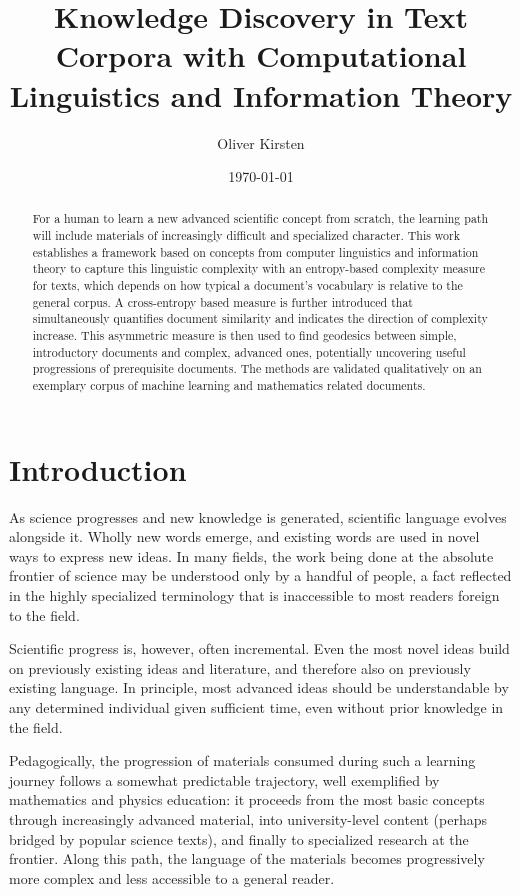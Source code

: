 \documentclass[12pt,a4paper]{article}
\title{Knowledge Discovery in Text Corpora with Computational Linguistics and Information Theory}
\author{Oliver Kirsten}
\date{\today}
\begin{document}
\maketitle

\begin{abstract}
For a human to learn a new advanced scientific concept from scratch, the learning path will include materials of increasingly difficult and specialized character. This work establishes a framework based on concepts from computer linguistics and information theory to capture this linguistic complexity with an entropy-based complexity measure for texts, which depends on how typical a document's vocabulary is relative to the general corpus. A cross-entropy based measure is further introduced that simultaneously quantifies document similarity and indicates the direction of complexity increase. This asymmetric measure is then used to find geodesics between simple, introductory documents and complex, advanced ones, potentially uncovering useful progressions of prerequisite documents. The methods are validated qualitatively on an exemplary corpus of machine learning and mathematics related documents.
\end{abstract}

\section{Introduction}

As science progresses and new knowledge is generated, scientific language evolves alongside it. Wholly new words emerge, and existing words are used in novel ways to express new ideas. In many fields, the work being done at the absolute frontier of science may be understood only by a handful of people, a fact reflected in the highly specialized terminology that is inaccessible to most readers foreign to the field.

Scientific progress is, however, often incremental. Even the most novel ideas build on previously existing ideas and literature, and therefore also on previously existing language. In principle, most advanced ideas should be understandable by any determined individual given sufficient time, even without prior knowledge in the field.

Pedagogically, the progression of materials consumed during such a learning journey follows a somewhat predictable trajectory, well exemplified by mathematics and physics education: it proceeds from the most basic concepts through increasingly advanced material, into university-level content (perhaps bridged by popular science texts), and finally to specialized research at the frontier. Along this path, the language of the materials becomes progressively more complex and less accessible to a general reader.
\end{document}
